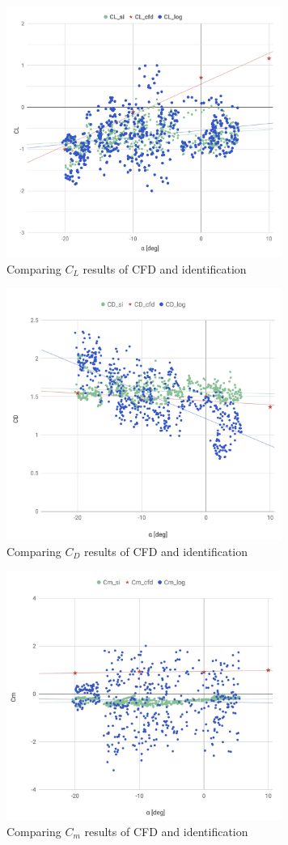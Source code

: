 \begin{figure}[H]
  \centering
  \includegraphics[clip,width=9cm,bb=0 0 1912 1743]{./z_figure_files/chapter5/cfd_L.jpeg}
  \caption{\small{Comparing $C_L$ results of CFD and identification}}
  \label{fig:cfd_L}
\end{figure}
\begin{figure}[H]
  \centering
  \includegraphics[clip,width=9cm,bb=0 0 1819 1662]{./z_figure_files/chapter5/cfd_D.jpeg}
  \caption{\small{Comparing $C_D$ results of CFD and identification}}
  \label{fig:cfd_D}
\end{figure}
\begin{figure}[H]
  \centering
    \includegraphics[clip,width=9cm,bb=0 0 1832 1662]{./z_figure_files/chapter5/cfd_m.jpeg}
    \caption{\small{Comparing $C_m$ results of CFD and identification}}
    \label{fig:cfd_Ma}
\end{figure}
